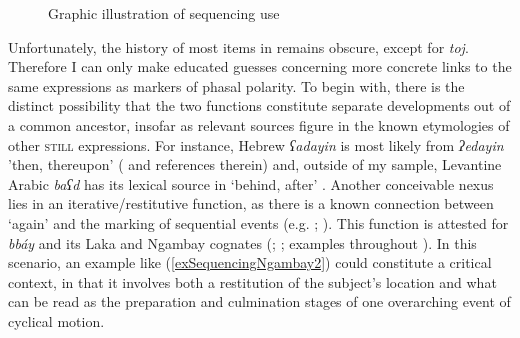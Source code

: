 \begin{figure}
\begin{subfigure}[b]{0.48\linewidth}
	\end{subfigure}
	\caption{Graphic illustration of sequencing use\label{figureSequencing}}
\end{figure}

Unfortunately,  the history of most items in  remains obscure, except for  \textit{toj}. Therefore I can only make educated guesses concerning more concrete links to the same expressions as markers of phasal polarity. To begin with, there is the distinct possibility that the two functions constitute separate developments out of a common ancestor, insofar as relevant sources figure in the known etymologies of other \textsc{still} expressions. For instance, Hebrew \textit{ʕadayin} is most likely from  \textit{ʔedayin} \rq{}then, thereupon\rq{ }(\cite{TsirkinSadan2019} and references therein) and, outside of my sample, Levantine Arabic \textit{baʕd} has its lexical source in \lq behind, after\rq{ }\parencite{TaineCheikh2016}. Another conceivable nexus lies in an iterative/restitutive function, as there is a known connection between \lq again\rq{ }and the marking of sequential events (e.g. \cite{MoyseFaurie2012}; \cite{Zhang2017}). This  function is attested for  \textit{bbáy} and its Laka and Ngambay cognates (\cite[426]{Moser2004}; \cite[118–119]{Vandame1963}; examples throughout \cite{Keegan2014}). In this scenario, an example like (\ref{exSequencingNgambay2}) could constitute a critical context, in that it involves both a restitution of the subject's location and what can be read as the preparation and culmination stages of one overarching event of cyclical motion.

